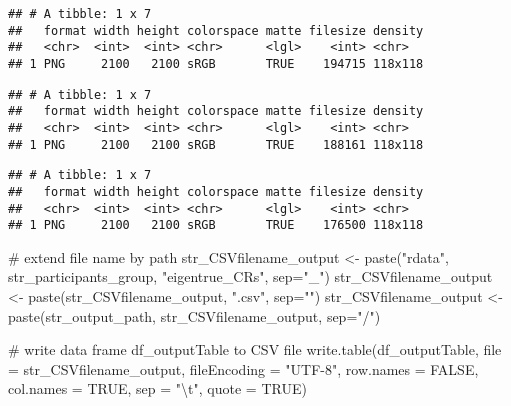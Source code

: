 \documentclass[
]{article}
\newenvironment{Shaded}{\begin{snugshade}}{\end{snugshade}}
\newcommand{\AttributeTok}[1]{\textcolor[rgb]{0.00,0.34,0.68}{#1}}
\newcommand{\CommentTok}[1]{\textcolor[rgb]{0.54,0.53,0.53}{#1}}
\newcommand{\ConstantTok}[1]{\textcolor[rgb]{0.67,0.33,0.00}{#1}}
\newcommand{\FunctionTok}[1]{\textcolor[rgb]{0.39,0.29,0.61}{#1}}
\newcommand{\NormalTok}[1]{\textcolor[rgb]{0.12,0.11,0.11}{#1}}
\newcommand{\OtherTok}[1]{\textcolor[rgb]{0.00,0.43,0.16}{#1}}
\newcommand{\SpecialCharTok}[1]{\textcolor[rgb]{0.24,0.68,0.91}{#1}}
\newcommand{\StringTok}[1]{\textcolor[rgb]{0.75,0.01,0.01}{#1}}
\begin{document}
\begin{verbatim}
## # A tibble: 1 x 7
##   format width height colorspace matte filesize density
##   <chr>  <int>  <int> <chr>      <lgl>    <int> <chr>  
## 1 PNG     2100   2100 sRGB       TRUE    194715 118x118
\end{verbatim}

\begin{verbatim}
## # A tibble: 1 x 7
##   format width height colorspace matte filesize density
##   <chr>  <int>  <int> <chr>      <lgl>    <int> <chr>  
## 1 PNG     2100   2100 sRGB       TRUE    188161 118x118
\end{verbatim}

\begin{verbatim}
## # A tibble: 1 x 7
##   format width height colorspace matte filesize density
##   <chr>  <int>  <int> <chr>      <lgl>    <int> <chr>  
## 1 PNG     2100   2100 sRGB       TRUE    176500 118x118
\end{verbatim}

\begin{Shaded}
\begin{Highlighting}[]
\CommentTok{\# extend file name by path}
\NormalTok{str\_CSVfilename\_output }\OtherTok{\textless{}{-}} \FunctionTok{paste}\NormalTok{(}\StringTok{"rdata"}\NormalTok{, str\_participants\_group, }\StringTok{"eigentrue\_CRs"}\NormalTok{, }\AttributeTok{sep=}\StringTok{"\_"}\NormalTok{)}
\NormalTok{str\_CSVfilename\_output }\OtherTok{\textless{}{-}} \FunctionTok{paste}\NormalTok{(str\_CSVfilename\_output, }\StringTok{".csv"}\NormalTok{, }\AttributeTok{sep=}\StringTok{""}\NormalTok{)}
\NormalTok{str\_CSVfilename\_output }\OtherTok{\textless{}{-}} \FunctionTok{paste}\NormalTok{(str\_output\_path, str\_CSVfilename\_output, }\AttributeTok{sep=}\StringTok{"/"}\NormalTok{)}

\CommentTok{\# write data frame \textquotesingle{}df\_outputTable\textquotesingle{} to CSV file}
\FunctionTok{write.table}\NormalTok{(df\_outputTable, }\AttributeTok{file =}\NormalTok{ str\_CSVfilename\_output,}
            \AttributeTok{fileEncoding =} \StringTok{"UTF{-}8"}\NormalTok{, }\AttributeTok{row.names =} \ConstantTok{FALSE}\NormalTok{,}
            \AttributeTok{col.names =} \ConstantTok{TRUE}\NormalTok{, }\AttributeTok{sep =} \StringTok{"}\SpecialCharTok{\textbackslash{}t}\StringTok{"}\NormalTok{, }\AttributeTok{quote =} \ConstantTok{TRUE}\NormalTok{)}
\end{Highlighting}
\end{Shaded}
\end{document}
